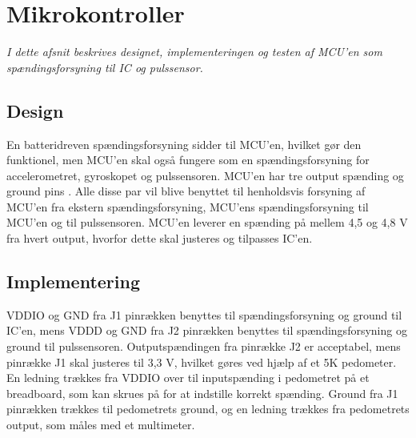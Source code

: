 \section{Mikrokontroller}
\textit{I dette afsnit beskrives designet, implementeringen og testen af MCU'en som spændingsforsyning til IC og pulssensor.}

\subsection{Design}
En batteridreven spændingsforsyning sidder til MCU'en, hvilket gør den funktionel, men MCU'en skal også fungere som en spændingsforsyning for accelerometret, gyroskopet og pulssensoren. MCU'en har tre output spænding og ground pins \citep{Semiconductor2016}. Alle disse par vil blive benyttet til henholdsvis forsyning af MCU'en fra ekstern spændingsforsyning, MCU'ens spændingsforsyning til MCU'en og til pulssensoren. MCU'en leverer en spænding på mellem 4,5 og 4,8 V fra hvert output, hvorfor dette skal justeres og tilpasses IC'en.

\subsection{Implementering}
VDDIO og GND fra J1 pinrækken benyttes til spændingsforsyning og ground til IC'en, mens VDDD og GND fra J2 pinrækken benyttes til spændingsforsyning og ground til pulssensoren. Outputspændingen fra pinrække J2 er acceptabel, mens pinrække J1 skal justeres til 3,3 V, hvilket gøres ved hjælp af et 5K pedometer. En ledning trækkes fra VDDIO over til inputspænding i pedometret på et breadboard, som kan skrues på for at indstille korrekt spænding. Ground fra J1 pinrækken trækkes til pedometrets ground, og en ledning trækkes fra pedometrets output, som måles med et multimeter.

